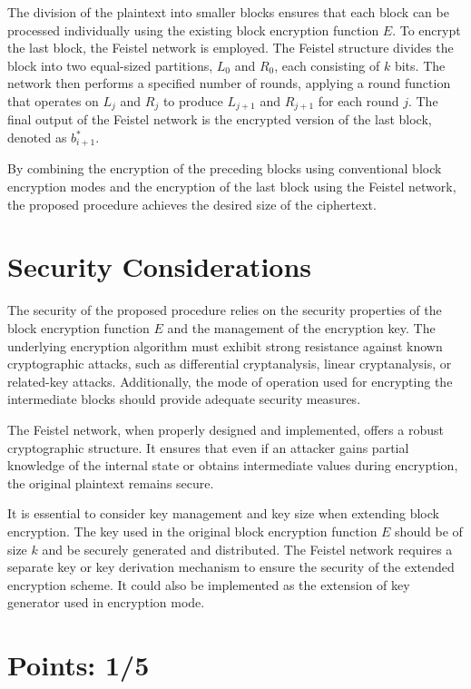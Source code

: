 \documentclass{article}
\begin{document}
    The division of the plaintext into smaller blocks ensures that each block can be processed individually using the existing block encryption function $E$. To encrypt the last block, the Feistel network is employed. The Feistel structure divides the block into two equal-sized partitions, $L_0$ and $R_0$, each consisting of $k$ bits. The network then performs a specified number of rounds, applying a round function that operates on $L_j$ and $R_j$ to produce $L_{j+1}$ and $R_{j+1}$ for each round $j$. The final output of the Feistel network is the encrypted version of the last block, denoted as $b_{i+1}^*$.

    \vspace{.2cm} By combining the encryption of the preceding blocks using conventional block encryption modes and the encryption of the last block using the Feistel network, the proposed procedure achieves the desired size of the ciphertext.

    \section{Security Considerations}

    \vspace{.1cm}The security of the proposed procedure relies on the security properties of the block encryption function $E$ and the management of the encryption key. The underlying encryption algorithm must exhibit strong resistance against known cryptographic attacks, such as differential cryptanalysis, linear cryptanalysis, or related-key attacks. Additionally, the mode of operation used for encrypting the intermediate blocks should provide adequate security measures.

    \vspace{.2cm} The Feistel network, when properly designed and implemented, offers a robust cryptographic structure. It ensures that even if an attacker gains partial knowledge of the internal state or obtains intermediate values during encryption, the original plaintext remains secure.

    \vspace{.2cm} It is essential to consider key management and key size when extending block encryption. The key used in the original block encryption function $E$ should be of size $k$ and be securely generated and distributed. The Feistel network requires a separate key or key derivation mechanism to ensure the security of the extended encryption scheme. It could also be implemented as the extension of key generator used in encryption mode.

    \section{Points: 1/5}
\end{document}
